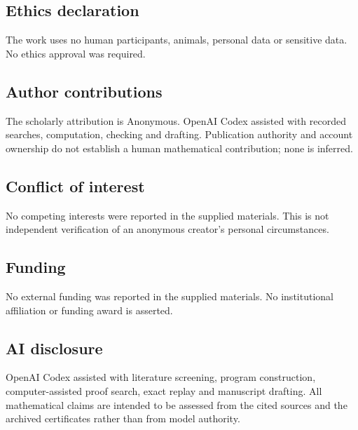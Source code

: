 \documentclass[11pt]{article}
\begin{document}
\subsection*{Ethics declaration}
The work uses no human participants, animals, personal data or sensitive
data. No ethics approval was required.

\subsection*{Author contributions}
The scholarly attribution is Anonymous. OpenAI Codex assisted with recorded
searches, computation, checking and drafting. Publication authority and account
ownership do not establish a human mathematical contribution; none is inferred.

\subsection*{Conflict of interest}
No competing interests were reported in the supplied materials. This is not
independent verification of an anonymous creator's personal circumstances.

\subsection*{Funding}
No external funding was reported in the supplied materials. No institutional
affiliation or funding award is asserted.

\subsection*{AI disclosure}
OpenAI Codex assisted with literature screening, program construction,
computer-assisted proof search, exact replay and manuscript drafting. All
mathematical claims are intended to be assessed from the cited sources and
the archived certificates rather than from model authority.
\end{document}
